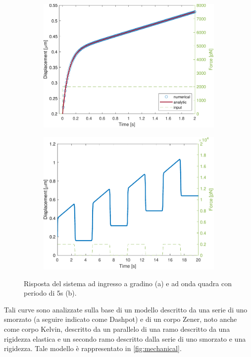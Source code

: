 \begin{figure}[t!]
	\begin{subfigure}{0.5\linewidth}
		\centering
		\includegraphics[width=0.95\linewidth]{../code/figs/step}
		\caption{}
		\label{fig:step}
	\end{subfigure}\hfill
	\begin{subfigure}{0.5\linewidth}
		\centering
		\includegraphics[width=0.95\linewidth]{../code/figs/square}
		\caption{}
		\label{fig:square}
	\end{subfigure}\hfill
	\caption{Risposta del sistema ad ingresso a gradino (a) e ad onda quadra con periodo di 5s (b).}
\end{figure}
Tali curve sono analizzate sulla base di un modello descritto da una serie di uno smorzato (a seguire indicato come Dashpot) e di un corpo Zener, noto anche come corpo Kelvin, descritto da un parallelo di una ramo descritto da una rigidezza elastica e un secondo ramo descritto dalla serie di uno smorzato e una rigidezza. Tale modello è rappresentato in \cref{fig:mechanical}.

